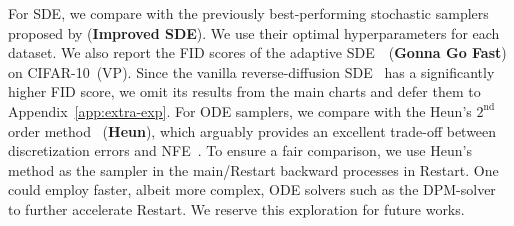 
For SDE, we compare with the previously best-performing stochastic samplers proposed by \cite{Karras2022ElucidatingTD} (\textbf{Improved SDE}). We use their optimal hyperparameters for each dataset. We also report the FID scores of the adaptive SDE~\cite{JolicoeurMartineau2021GottaGF}~(\textbf{Gonna Go Fast}) on CIFAR-10~(VP). Since the vanilla reverse-diffusion SDE~\cite{Song2020ScoreBasedGM} has a significantly higher FID score, we omit its results from the main charts and defer them to Appendix~\ref{app:extra-exp}. For ODE samplers, we compare with the Heun's $2^{\textrm{nd}}$ order method~\cite{Ascher1998ComputerMF} (\textbf{Heun}), which arguably provides an excellent trade-off between discretization errors and NFE~\cite{Karras2022ElucidatingTD}. To ensure a fair comparison, we use Heun's method as the sampler in the main/Restart backward processes in Restart. One could employ faster, albeit more complex, ODE solvers such as the DPM-solver~\cite{lu2022dpm} to further accelerate Restart. We reserve this exploration for future works. 


